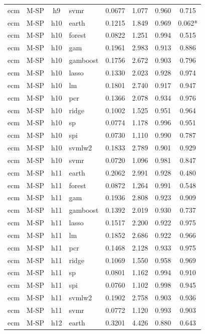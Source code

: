 \begin{ThreePartTable}
\begin{longtable}[t]{llclcccc}
ecm & M-SP & h9 & svmr & 0.0677 & 1.077 & 0.960 & 0.715\\
\addlinespace
ecm & M-SP & h10 & earth & 0.1215 & 1.849 & 0.969 & 0.062*\\
ecm & M-SP & h10 & forest & 0.0822 & 1.251 & 0.994 & 0.515\\
ecm & M-SP & h10 & gam & 0.1961 & 2.983 & 0.913 & 0.886\\
ecm & M-SP & h10 & gamboost & 0.1756 & 2.672 & 0.903 & 0.796\\
ecm & M-SP & h10 & lasso & 0.1330 & 2.023 & 0.928 & 0.974\\
ecm & M-SP & h10 & lm & 0.1801 & 2.740 & 0.917 & 0.947\\
ecm & M-SP & h10 & pcr & 0.1366 & 2.078 & 0.934 & 0.976\\
ecm & M-SP & h10 & ridge & 0.1002 & 1.525 & 0.951 & 0.964\\
ecm & M-SP & h10 & sp & 0.0774 & 1.178 & 0.996 & 0.951\\
ecm & M-SP & h10 & spi & 0.0730 & 1.110 & 0.990 & 0.787\\
ecm & M-SP & h10 & svmlw2 & 0.1833 & 2.789 & 0.901 & 0.929\\
ecm & M-SP & h10 & svmr & 0.0720 & 1.096 & 0.981 & 0.847\\
\addlinespace
ecm & M-SP & h11 & earth & 0.2062 & 2.991 & 0.928 & 0.480\\
ecm & M-SP & h11 & forest & 0.0872 & 1.264 & 0.991 & 0.548\\
ecm & M-SP & h11 & gam & 0.1936 & 2.808 & 0.923 & 0.909\\
ecm & M-SP & h11 & gamboost & 0.1392 & 2.019 & 0.930 & 0.737\\
ecm & M-SP & h11 & lasso & 0.1517 & 2.200 & 0.922 & 0.975\\
ecm & M-SP & h11 & lm & 0.1852 & 2.686 & 0.922 & 0.966\\
ecm & M-SP & h11 & pcr & 0.1468 & 2.128 & 0.933 & 0.975\\
ecm & M-SP & h11 & ridge & 0.1069 & 1.550 & 0.958 & 0.969\\
ecm & M-SP & h11 & sp & 0.0801 & 1.162 & 0.994 & 0.910\\
ecm & M-SP & h11 & spi & 0.0760 & 1.102 & 0.998 & 0.945\\
ecm & M-SP & h11 & svmlw2 & 0.1902 & 2.758 & 0.903 & 0.936\\
ecm & M-SP & h11 & svmr & 0.0772 & 1.120 & 0.993 & 0.903\\
\addlinespace
ecm & M-SP & h12 & earth & 0.3201 & 4.426 & 0.880 & 0.643\\

\end{longtable}
\end{ThreePartTable}
